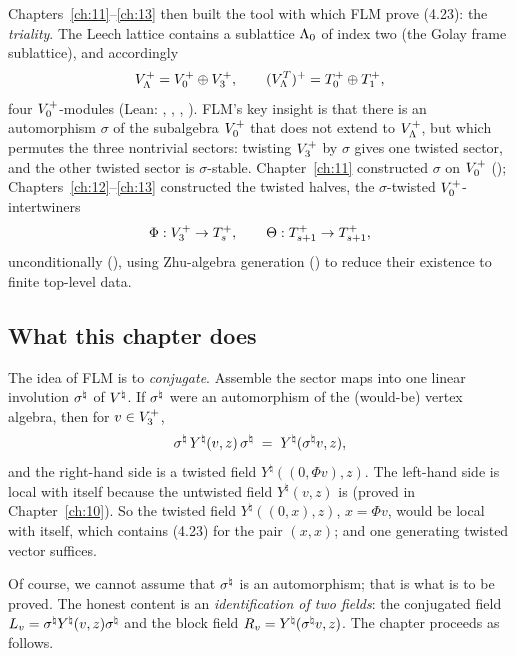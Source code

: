 Chapters~\ref{ch:11}--\ref{ch:13} then built the tool with which FLM prove (4.23): the
\emph{triality}.  The Leech lattice contains a sublattice ${\Lambda}_0$ of index two (the Golay frame
sublattice), and accordingly
\begin{equation*}
  V_{\Lambda}^+ = V_0^{+}\oplus V_3^{+},\qquad
  (V_{\Lambda}^T)^+ = T_0^+\oplus T_1^+ ,
\end{equation*}
four $V_0^{+}$-modules (Lean: , , ,
).  FLM's key insight is that there is an automorphism $\sigma$ of the subalgebra
$V_0^{+}$ that does not extend to $V_{\Lambda}^+$, but which permutes the three nontrivial sectors:
twisting $V_3^{+}$ by $\sigma$ gives one twisted sector, and the other twisted sector is
$\sigma$-stable.  Chapter~\ref{ch:11} constructed $\sigma$ on $V_0^{+}$ ();
Chapters~\ref{ch:12}--\ref{ch:13} constructed the twisted halves, the $\sigma$-twisted
$V_0^{+}$-intertwiners
\begin{equation*}
  \Phi:V_3^{+}\to T_s^+,\qquad \Theta:T_{s+1}^+\to T_{s+1}^+,
\end{equation*}
unconditionally (), using Zhu-algebra generation
() to reduce their existence to finite top-level data.

\subsection{What this chapter does}

The idea of FLM is to \emph{conjugate}.  Assemble the sector maps into one linear involution
$\sigma^{\natural}$ of ${V^{\natural}}$.  If $\sigma^{\natural}$ were an automorphism of the (would-be) vertex algebra,
then for $v\in V_3^{+}$,
\begin{equation*}
  \sigma^{\natural}\,Y^\natural(v,z)\,\sigma^{\natural} \;=\; Y^\natural(\sigma^{\natural} v,z),
\end{equation*}
and the right-hand side is a twisted field $Y^\natural((0,\Phi v),z)$.  The left-hand side is local
with itself because the untwisted field $Y^\natural(v,z)$ is (proved in Chapter~\ref{ch:10}).  So
the twisted field $Y^\natural((0,x),z)$, $x=\Phi v$, would be local with itself, which contains
(4.23) for the pair $(x,x)$; and one generating twisted vector suffices.

Of course, we cannot assume that $\sigma^{\natural}$ is an automorphism; that is what is to be proved.
The honest content is an \emph{identification of two fields}: the conjugated field
$L_v=\sigma^{\natural} Y^\natural(v,z)\sigma^{\natural}$ and the block field $R_v=Y^\natural(\sigma^{\natural} v,z)$.
The chapter proceeds as follows.

